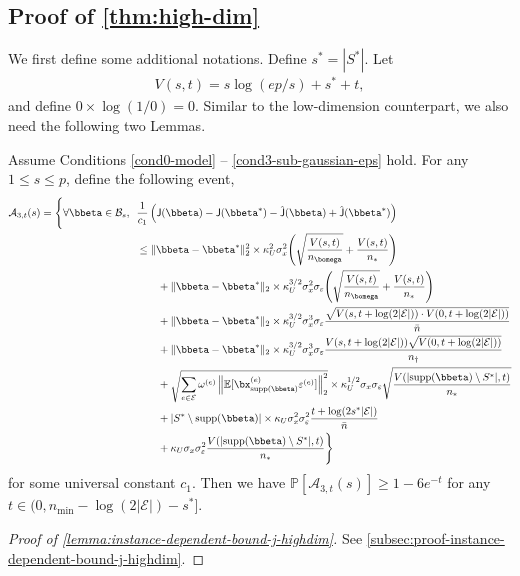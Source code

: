 \documentclass[10pt]{article}
\numberwithin{equation}{section}
\newcommand*{\supp}{\mathrm{supp}}
\begin{document}
\subsection{Proof of \cref{thm:high-dim}}

We first define some additional notations. Define $s^*=|S^*|$. Let 
\begin{align*}
    V(s,t) = s\log (ep/s) + s^* + t,
\end{align*} and define $0\times \log(1/0) = 0$.
Similar to the low-dimension counterpart, we also need the following two Lemmas.


\begin{lemma}
\label{lemma:instance-dependent-bound-j-highdim}
Assume Conditions \ref{cond0-model} -- \ref{cond3-sub-gaussian-eps} hold. For any $1\le s\le p$, define the following event,
\begin{align}
\label{eq:instance-dependent-bound-j-highdim}
\begin{split}
    \mathcal{A}_{3,t}(s) = \Bigg\{ \forall \bbeta \in \mathcal{B}_s, ~~& \frac{1}{c_1} \left(\mathsf{J}(\bbeta) - \mathsf{J}(\bbeta^*) - \hat{\mathsf{J}}(\bbeta) + \hat{\mathsf{J}}(\bbeta^*)\right) \\
    &\le \|\bbeta - \bbeta^*\|_2^2 \times \kappa_U^2\sigma_x^2 \Bigg(\sqrt{\frac{V(s,t)}{n_{\bomega}}} + \frac{V(s,t)}{n_*}\Bigg) \\
    &~~~~~~ + \|\bbeta - \bbeta^*\|_2 \times \kappa_U^{3/2}\sigma_x^2 \sigma_\varepsilon \Bigg(\sqrt{\frac{V(s,t)}{n_{\bomega}}} + \frac{V(s,t)}{n_*}\Bigg)  \\
    &~~~~~~ + \|\bbeta - \bbeta^*\|_2 \times \kappa_U^{3/2}\sigma_x^3 \sigma_\varepsilon \frac{\sqrt{V(s,t+\log(2|\mathcal{E}|)) \cdot V(0, t+\log(2|\mathcal{E}|))}}{\bar{n}}\\
    &~~~~~~ + \|\bbeta - \bbeta^*\|_2 \times \kappa_U^{3/2}\sigma_x^3 \sigma_\varepsilon \frac{V(s,t+\log(2|\mathcal{E}|))\sqrt{V(0, t+\log(2|\mathcal{E}|))}}{n_\dagger} \\
    &~~~~~~ + \sqrt{\sum_{e\in \mathcal{E}} \omega^{(e)} \left\|\mathbb{E} [\bx_{\supp(\bbeta)}^{(e)} \varepsilon^{(e)}]\right\|_2^2} \times \kappa_U^{1/2} \sigma_x \sigma_\varepsilon \sqrt{\frac{V(|\supp(\bbeta) \setminus S^*|,t)}{n_*}}  \\
    &~~~~~~ + |S^*\setminus \supp(\bbeta)| \times \kappa_U \sigma_x^2\sigma_\varepsilon^2  \frac{t+ \log(2s^*|\mathcal{E}|)}{\bar{n}} \\
    &~~~~~~ + \kappa_U \sigma_x \sigma_\varepsilon^2 \frac{V(|\supp(\bbeta)\setminus S^*|,t)}{n_*}
    \Bigg\}
\end{split}
\end{align} for some universal constant $c_1$. Then we have $\mathbb{P} [\mathcal{A}_{3,t}(s)] \ge 1-6e^{-t}$ for any $t\in (0, n_{\min} - \log(2|\mathcal{E}|) - s^*]$.
\end{lemma}
\begin{proof}[Proof of \cref{lemma:instance-dependent-bound-j-highdim}]
    See \cref{subsec:proof-instance-dependent-bound-j-highdim}.
\end{proof}
\end{document}
